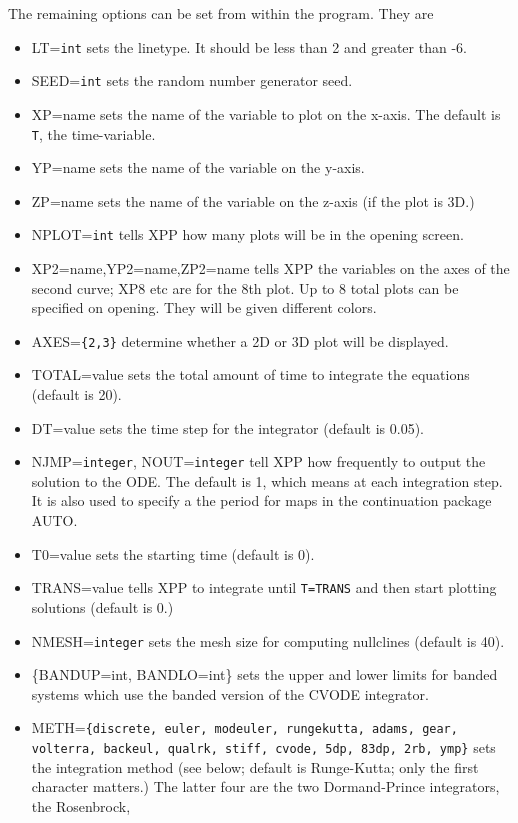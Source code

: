 \documentclass{article}
\begin{document}
The remaining options can be set from within the program. They are 
\begin{itemize}
\item LT={\tt int} sets the linetype. It should be less than 2 and
greater than -6. 
\item SEED={\tt int} sets the random number generator seed. 
 \item XP=name sets the name of the variable to plot on the x-axis.
The default is {\tt T}, the time-variable.
\item YP=name sets the name of the variable on the y-axis.
\item ZP=name sets the name of the variable on the z-axis (if the plot
is 3D.) 
\item NPLOT={\tt int} tells XPP how many plots will be in the opening
screen. 
\item XP2=name,YP2=name,ZP2=name tells XPP the variables on the axes
of the second curve; XP8 etc are for the 8th plot. Up to 8 total plots
can be specified on opening. They will be given different colors.  
\item AXES={\tt \{2,3\}} determine whether a 2D or 3D plot will be
displayed.
\item TOTAL=value sets the total amount of time to integrate the
equations (default is 20).
\item DT=value sets the time step for the integrator (default is 0.05).
\item NJMP={\tt integer}, NOUT={\tt integer}
 tell XPP how frequently to output the
solution to the ODE.  The default is 1, which means at each
integration step. It is also used to specify a the period for maps in
the continuation package AUTO.
\item T0=value sets the starting time (default is 0). 
\item TRANS=value tells XPP to integrate until {\tt T=TRANS} and then
start plotting solutions (default is 0.)
\item NMESH={\tt integer} sets the mesh size for computing nullclines
(default is 40).
\item \{BANDUP=int, BANDLO=int\} sets the upper and lower limits for
banded systems which use the banded version of the CVODE integrator.
\item METH={\tt \{discrete, euler, modeuler, rungekutta, adams, gear, volterra, backeul,
qualrk, stiff, cvode, 5dp, 83dp, 2rb, ymp\}}
sets the integration method (see below; default is Runge-Kutta; only the first character matters.) The
latter four are the two Dormand-Prince integrators, the Rosenbrock, 

\end{itemize}
\end{document}
